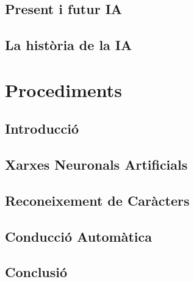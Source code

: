 \documentclass[a4paper,12pt]{report}
\begin{document}
\chapter{Present i futur IA}


\chapter{La història de la IA}


\part{Procediments}

\chapter{Introducció}


\chapter{Xarxes Neuronals Artificials}


\chapter{Reconeixement de Caràcters}


\chapter{Conducció Automàtica}


\chapter{Conclusió}


\appendix


\printbibliography
\end{document}
